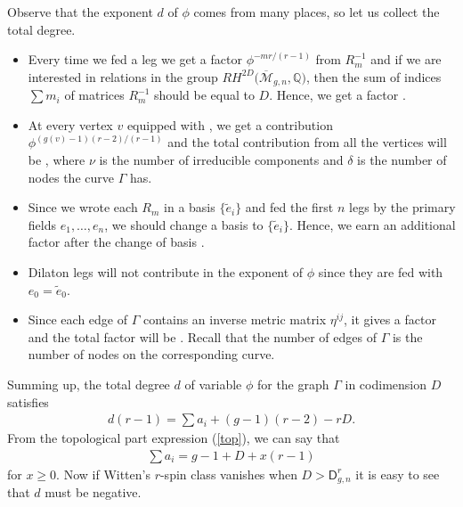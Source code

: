 \documentclass[10pt,a4paper]{amsart}
\def\oM{\overline{\mathcal{M}}}
\def\D{\mathsf{D}}
\numberwithin{equation}{section}
\begin{document}
Observe that the exponent $d$ of $\phi$ comes from many places, so let us collect the total degree.%
\begin{itemize}\itemsep=0pt
 \item Every time we fed a leg we get a factor
$\phi^{-m r/(r-1)}$ from $R_m^{-1}$ and if we are
interested in relations in the group $RH^{2D}\big(\oM_{g,n},\mathbb{Q}\big)$, then the sum of indices $\sum m_i$ of matrices $R_m^{-1}$ should be equal to $D$. Hence, we get a factor .

\item At every vertex $v$ equipped with , we get a contribution $\phi ^{(g(v)-1)(r-2)/(r-1)}$ and the total contribution from all the vertices will be , where $\nu$ is the number of irreducible components and $\delta$ is the number of nodes the curve $\Gamma$ has.

\item Since we wrote each $R_m$ in a basis $\{\widetilde{e}_i\}$ and fed the first $n$ legs by the primary fields $e_1,\dots,e_n$, we should change a basis to $\{\widetilde{e}_i\}$. Hence, we earn an additional factor  after the change of basis .

 \item Dilaton legs will not contribute in the exponent of $\phi$ since they are fed with $e_0=\widetilde{e}_0$.

 \item Since each edge of $\Gamma$ contains an inverse metric matrix $\eta^{ij}$, it gives a factor  and the total factor will be . Recall that the number of edges of $\Gamma$ is the number of nodes on the corresponding curve.
 \end{itemize}

 Summing up, the total degree $d$ of variable $\phi$ for the graph $\Gamma$ in codimension $D$ satisfies
 \begin{align*}
 d(r-1) = \sum a_i + (g-1)(r-2) - r D.
 \end{align*}
 From the topological part expression (\ref{top}), we can say that
 \begin{align*}
 \sum a_i = g-1+D+x(r-1)
 \end{align*}
 for $x\geq 0$.
 Now if Witten's $r$-spin class vanishes when $D >\D^r_{g,n} $ it is easy to see that $d$ must be negative.
\end{document}
